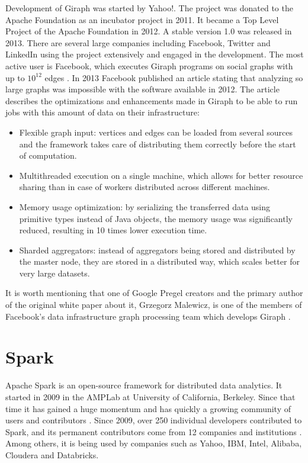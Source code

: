 Development of Giraph was started by Yahoo!. The project was donated to the Apache Foundation as an incubator project in 2011. It became a Top Level Project of the Apache Foundation in 2012. A stable version 1.0 was released in 2013. There are several large companies including Facebook, Twitter and LinkedIn using the project extensively and engaged in the development. The most active user is Facebook, which executes Giraph programs on social graphs with up to $10^{12}$ edges \cite{giraphfb}. In 2013 Facebook published an article \cite{giraphfb} stating that analyzing so large graphs was impossible with the software available in 2012. The article describes the optimizations and enhancements made in Giraph to be able to run jobs with this amount of data on their infrastructure:
\begin{itemize}
\item Flexible graph input: vertices and edges can be loaded from several sources and the framework takes care of distributing them correctly before the start of computation.
\item Multithreaded execution on a single machine, which allows for better resource sharing than in case of workers distributed across different machines.
\item Memory usage optimization: by serializing the transferred data using primitive types instead of Java objects, the memory usage was significantly reduced, resulting in 10 times lower execution time.
\item Sharded aggregators: instead of aggregators being stored and distributed by the master node, they are stored in a distributed way, which scales better for very large datasets.
\end{itemize}
It is worth mentioning that one of Google Pregel creators and the primary author of the original white paper about it, Grzegorz Malewicz, is one of the members of Facebook's data infrastructure graph processing team which develops Giraph \cite{giraphfb}.

\section{Spark}\label{s:spark}
Apache Spark \cite{spark, spark2} is an open-source framework for distributed data analytics. It started in 2009 in the AMPLab at University of California, Berkeley. Since that time it has gained a huge momentum and has quickly a growing community of users and contributors \cite{sparkgrowingcommunity}. Since 2009, over 250 individual developers contributed to Spark, and its permanent contributors come from 12 companies and institutions \cite{sparkwww}. Among others, it is being used by companies such as Yahoo, IBM, Intel, Alibaba, Cloudera and Databricks.

